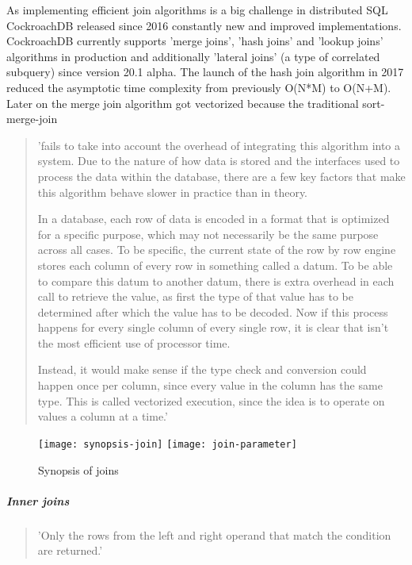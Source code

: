As implementing efficient join algorithms is a big challenge in distributed SQL CockroachDB released since 2016 
constantly new and improved implementations.
CockroachDB currently supports ’merge joins’, ’hash joins’ and ’lookup joins' algorithms in production and additionally
{’lateral joins’} (a type of correlated subquery) since version 20.1 alpha.
The launch of the hash join algorithm in 2017 reduced the asymptotic time complexity from previously O(N*M) to O(N+M).
Later on the merge join algorithm got vectorized because the traditional sort-merge-join \begin{quote} 'fails to take into 
account the overhead of integrating this algorithm into a system. Due to the nature of how data is stored and the interfaces 
used to process the data within the database, there are a few key factors that make this algorithm behave slower in practice 
than in theory. 

In a database, each row of data is encoded in a format that is optimized for a specific purpose, which may 
not necessarily be the same purpose across all cases. To be specific, the current state of the row by row engine stores each 
column of every row in something called a datum. To be able to compare this datum to another datum, there is extra overhead 
in each call to retrieve the value, as first the type of that value has to be determined after which the value has to be 
decoded. Now if this process happens for every single column of every single row, it is clear that isn’t the most efficient 
use of processor time.

Instead, it would make sense if the type check and conversion could happen once per column, since every value in the column 
has the same type. This is called vectorized execution, since the idea is to operate on values a column at a time.'\cite{cockroach-vectorizing-joiner}
\end{quote}
\newpage
\begin{figure}[H]
	\begin{center}
		\texttt{[image: synopsis-join]}
		\texttt{[image: join-parameter]}
	\end{center}
    \caption{Synopsis of joins\cite{cockroach-sql-joins}}
    \label{fig:synopsis-join}
\end{figure}



\subparagraph{Inner joins}
\begin{quote}
'Only the rows from the left and right operand that match the condition are returned.'\cite{cockroach-sql-joins}
\end{quote}

